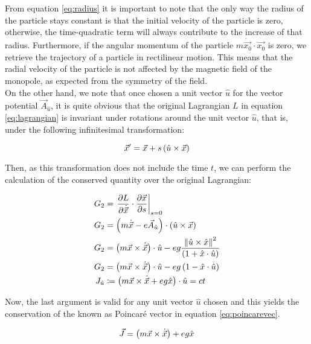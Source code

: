 From equation \eqref{eq:radius} it is important to note that the only way the radius of the particle stays constant is that the initial velocity of the particle is zero, otherwise, the time-quadratic term will always contribute to the increase of that radius. Furthermore, if the angular momentum of the particle $m\dot{\vec{x_0}}\cdot\vec{x_0}$ is zero, we retrieve the trajectory of a particle in rectilinear motion. This means that the radial velocity of the particle is not affected by the magnetic field of the monopole, as expected from the symmetry of the field.\\

On the other hand, we note that once chosen a unit vector $\hat{u}$ for the vector potential  $\vec{A}_{\hat{u}}$, it is quite obvious that the original Lagrangian $L$ in equation \eqref{eq:lagrangian} is invariant under rotations around the unit vector $\hat{u}$, that is, under the following infinitesimal transformation:

\begin{equation}
\vec{x}' = \vec{x} + s\left( \hat{u}\times\vec{x} \right)
\label{eq:rotinv}
\end{equation}

Then, as this transformation does not include the time $t$, we can perform the calculation of the conserved quantity over the original Lagrangian:

\begin{align*}
G_2 &= \left. \frac{\partial L}{\partial \dot{\vec{x}}}\cdot\frac{\partial \vec{x}}{\partial s} \right|_{s=0}\\
G_2 &= \left( m\dot{\vec{x}} - e\vec{A}_{\hat{u}} \right)\cdot \left( \hat{u}\times\vec{x} \right) \\
G_2 &= \left( m\vec{x}\times\dot{\vec{x}} \right)\cdot\hat{u}-eg\frac{\left\lVert \hat{u}\times\hat{x} \right\rVert^2}{\left( 1+\hat{x}\cdot\hat{u} \right)}\\
G_2 &= \left( m\vec{x}\times\dot{\vec{x}} \right)\cdot\hat{u} -eg\left( 1-\hat{x}\cdot\hat{u} \right)\\
J_{\hat{u}} &\coloneqq \left( {m\vec{x}\times\dot{\vec{x}}}+ eg\hat{x} \right)\cdot\hat{u} = ct
\end{align*}

Now, the last argument is valid for any unit vector $\hat{u}$ chosen and this yields the conservation of the  known as Poincar\'e vector in equation \eqref{eq:poincarevec}.

\begin{equation}
\vec{J} = \left( m\vec{x}\times\dot{\vec{x}} \right)+ eg\hat{x}
\label{eq:poincarevec}
\end{equation}

